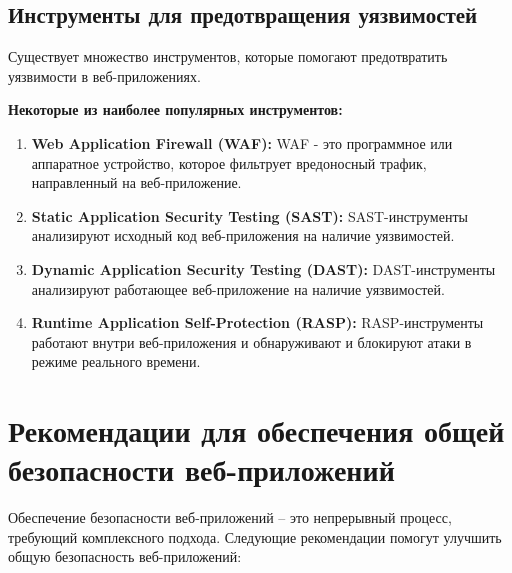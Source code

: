 \documentclass[a4paper,12pt]{diplom}
\begin{document}
	 \subsection{Инструменты для предотвращения уязвимостей}
	 
	 Существует множество инструментов, которые помогают предотвратить уязвимости в веб-приложениях.  
	 
	 \textbf{Некоторые из наиболее популярных инструментов:}
	 
	 \begin{enumerate}[label=\arabic{enumi})]
	 	\item \textbf{Web Application Firewall (WAF):}  WAF - это программное или аппаратное устройство, которое фильтрует вредоносный трафик, направленный на веб-приложение.
	 	\item \textbf{Static Application Security Testing (SAST):} SAST-инструменты анализируют исходный код веб-приложения на наличие уязвимостей. 
	 	\item \textbf{Dynamic Application Security Testing (DAST):}  DAST-инструменты анализируют работающее веб-приложение на наличие уязвимостей. 
	 	\item \textbf{Runtime Application Self-Protection (RASP):} RASP-инструменты работают внутри веб-приложения и обнаруживают и блокируют атаки в режиме реального времени. 
	 \end{enumerate}
	 				
	 				
	 				
	 				
	 				
	 				
	 				
	 				
	 				
	 				
	 				
	 				
	 				
	 				
	 
	 \section{Рекомендации для обеспечения общей безопасности веб-приложений}
	 
	 Обеспечение безопасности веб-приложений – это непрерывный процесс, требующий комплексного подхода. Следующие рекомендации помогут улучшить общую безопасность веб-приложений:
	 
\end{document}
